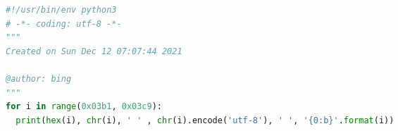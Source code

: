 \begin{spacing}{0.8}
\begin{small}
\begin{lstlisting}[language=Python]
#!/usr/bin/env python3
# -*- coding: utf-8 -*-
"""
Created on Sun Dec 12 07:07:44 2021

@author: bing
"""
for i in range(0x03b1, 0x03c9):
  print(hex(i), chr(i), ' ' , chr(i).encode('utf-8'), ' ', '{0:b}'.format(i))\end{lstlisting}
\end{small}
\end{spacing}
